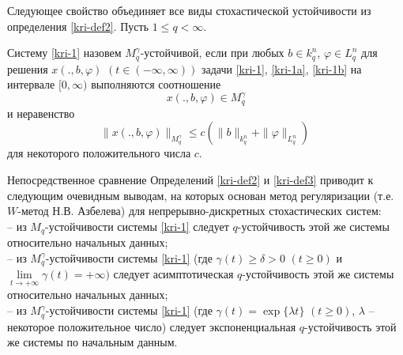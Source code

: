 Следующее свойство объединяет все виды стохастической устойчивости
из определения \ref{kri-def2}. Пусть $1\le q <\infty$.

\begin{definition}\label{kri-def3}  Систему \eqref{kri-1} назовем  $M_q^\gamma
 $-устойчивой, если при любых $b \in k^n_q$, $\varphi \in L^n_q$ для
 решения $x(., b, \varphi)$ $(t \in (-\infty , \infty ))$ задачи \eqref{kri-1}, \eqref{kri-1a},
 \eqref{kri-1b}  на интервале
 $[0,\infty)$ выполняются соотношение $$x(., b, \varphi) \in M_q^\gamma$$ и
 неравенство
 $$
 \|x(., b, \varphi)\|_{M_q^\gamma} \le c\left (\|b\|_{k^n_q} +
 \|\varphi \|_{L^n_q}\right ) \
 $$
 для некоторого положительного числа $c$.
\end{definition}

 Непосредственное сравнение Определений \ref{kri-def2} и \ref{kri-def3} приводит к следующим очевидным выводам,
 на которых основан метод регуляризации (т.е. $W$-метод Н.В. Азбелева) для непрерывно-дискретных стохастических систем:\\
\noindent
  -- из  $M_q$-устойчивости системы \eqref{kri-1}
 следует $q$-устойчивость этой же системы относительно
 начальных
 данных;\\
  -- из $M_q^\gamma $-устойчивости системы \eqref{kri-1}
 (где $\gamma (t) \ge \delta > 0$ $(t \ge 0)$ и $\lim \limits
 _{t
 \rightarrow +\infty } \gamma (t) = +\infty )$ следует
 асимптотическая $q$-устойчивость этой же системы
 относительно
 начальных данных;\\
  -- из $M_q^\gamma $-устойчивости системы \eqref{kri-1}
 (где $\gamma (t) = \exp \{\lambda t\}$ $(t \geq 0)$, $\lambda$ --
 некоторое
 положительное число) следует экспоненциальная
 $q$-устойчивость
 этой же системы по начальным данным.


